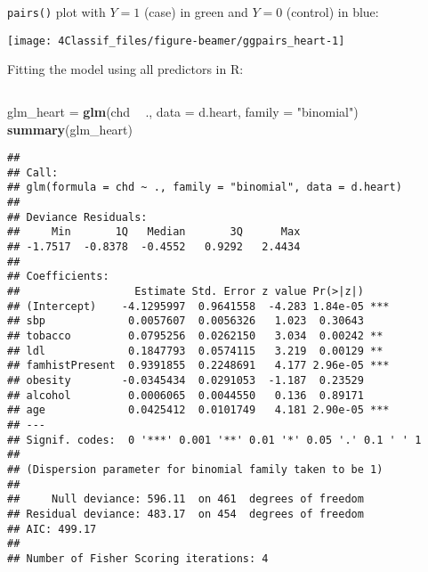 \documentclass[10pt,ignorenonframetext,]{beamer}
\newenvironment{Shaded}{\begin{snugshade}}{\end{snugshade}}
\newcommand{\DataTypeTok}[1]{\textcolor[rgb]{0.13,0.29,0.53}{#1}}
\newcommand{\KeywordTok}[1]{\textcolor[rgb]{0.13,0.29,0.53}{\textbf{#1}}}
\newcommand{\NormalTok}[1]{#1}
\newcommand{\OperatorTok}[1]{\textcolor[rgb]{0.81,0.36,0.00}{\textbf{#1}}}
\newcommand{\StringTok}[1]{\textcolor[rgb]{0.31,0.60,0.02}{#1}}
\begin{document}
\begin{frame}[fragile]

\texttt{pairs()} plot with \(Y=1\) (case) in green and \(Y=0\) (control)
in blue:

\begin{center}\texttt{[image: 4Classif\_files/figure-beamer/ggpairs\_heart-1]} \end{center}

\end{frame}

\begin{frame}[fragile]

Fitting the model using all predictors in R:

\(~\)

\tiny

\begin{Shaded}
\begin{Highlighting}[]
\NormalTok{glm_heart =}\StringTok{ }\KeywordTok{glm}\NormalTok{(chd }\OperatorTok{~}\StringTok{ }\NormalTok{., }\DataTypeTok{data =}\NormalTok{ d.heart, }\DataTypeTok{family =} \StringTok{"binomial"}\NormalTok{)}
\KeywordTok{summary}\NormalTok{(glm_heart)}
\end{Highlighting}
\end{Shaded}

\begin{verbatim}
## 
## Call:
## glm(formula = chd ~ ., family = "binomial", data = d.heart)
## 
## Deviance Residuals: 
##     Min       1Q   Median       3Q      Max  
## -1.7517  -0.8378  -0.4552   0.9292   2.4434  
## 
## Coefficients:
##                  Estimate Std. Error z value Pr(>|z|)    
## (Intercept)    -4.1295997  0.9641558  -4.283 1.84e-05 ***
## sbp             0.0057607  0.0056326   1.023  0.30643    
## tobacco         0.0795256  0.0262150   3.034  0.00242 ** 
## ldl             0.1847793  0.0574115   3.219  0.00129 ** 
## famhistPresent  0.9391855  0.2248691   4.177 2.96e-05 ***
## obesity        -0.0345434  0.0291053  -1.187  0.23529    
## alcohol         0.0006065  0.0044550   0.136  0.89171    
## age             0.0425412  0.0101749   4.181 2.90e-05 ***
## ---
## Signif. codes:  0 '***' 0.001 '**' 0.01 '*' 0.05 '.' 0.1 ' ' 1
## 
## (Dispersion parameter for binomial family taken to be 1)
## 
##     Null deviance: 596.11  on 461  degrees of freedom
## Residual deviance: 483.17  on 454  degrees of freedom
## AIC: 499.17
## 
## Number of Fisher Scoring iterations: 4
\end{verbatim}

\end{frame}
\end{document}
